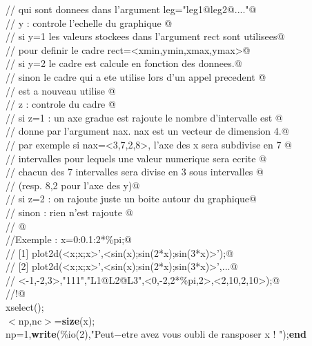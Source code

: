 {\begin{flushleft}
{\cmarg \verb@//        qui sont donnees dans l'argument leg="leg1@leg2@...."@\\ 
\cmarg \verb@//     y : controle l'echelle du graphique @\\ 
\cmarg \verb@//        si y=1 les valeurs stockees dans l'argument rect sont utilisees@\\ 
\cmarg \verb@//           pour definir le cadre  rect=<xmin,ymin,xmax,ymax>@\\ 
\cmarg \verb@//        si y=2 le cadre est calcule en fonction des donnees.@\\ 
\cmarg \verb@//        sinon le cadre qui a ete utilise lors d'un appel precedent @\\ 
\cmarg \verb@//           est a nouveau utilise @\\ 
\cmarg \verb@//     z : controle du cadre @\\ 
\cmarg \verb@//        si z=1 : un axe gradue est rajoute le nombre d'intervalle est @\\ 
\cmarg \verb@//        donne par l'argument nax. nax est un vecteur de dimension 4.@\\ 
\cmarg \verb@//        par exemple si nax=<3,7,2,8>, l'axe des x sera subdivise en 7 @\\ 
\cmarg \verb@//        intervalles pour lequels une valeur numerique sera ecrite @\\ 
\cmarg \verb@//        chacun des 7 intervalles sera divise en 3 sous intervalles @\\ 
\cmarg \verb@//        (resp. 8,2 pour l'axe des y)@\\ 
\cmarg \verb@//        si z=2 : on rajoute juste un boite autour du graphique@\\ 
\cmarg \verb@//        sinon  : rien n'est rajoute @\\ 
\cmarg \verb@// @\\ 
\cmarg \verb@//Exemple : x=0:0.1:2*\%pi;@\\ 
\cmarg \verb@//  [1]    plot2d(<x;x;x>',<sin(x);sin(2*x);sin(3*x)>');@\\ 
\cmarg \verb@//  [2]    plot2d(<x;x;x>',<sin(x);sin(2*x);sin(3*x)>',...@\\ 
\cmarg \verb@//           <-1,-2,3>,"111","L1@L2@L3",<0,-2,2*\%pi,2>,<2,10,2,10>);@\\ 
\cmarg \verb@//!@\\ 
\cmarg xselect();\\ 
\cmarg $<$np,nc$>$={\bf size}(x);\\ 
 np=1,{\bf write}(\%io(2),"Peut$-$etre avez vous oubli de ransposer x ! ");{\bf end}\\ 
}
\end{flushleft}}
